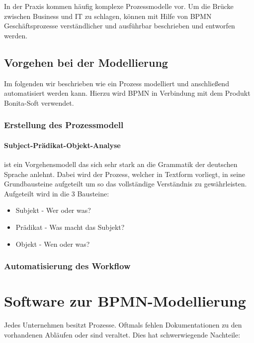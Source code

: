 In der Praxis kommen häufig komplexe Prozessmodelle vor. 
Um die Brücke zwischen Business und IT zu schlagen, 
können mit Hilfe von BPMN Geschäftsprozesse verständlicher und ausführbar 
beschrieben und entworfen werden.\\



\subsection{Vorgehen bei der Modellierung}
Im folgenden wir beschrieben wie ein Prozess modelliert und anschließend
automatisiert werden kann. Hierzu wird BPMN in Verbindung mit dem Produkt
Bonita-Soft verwendet.

\subsubsection{Erstellung des Prozessmodell}

\paragraph{Subject-Prädikat-Objekt-Analyse} ist ein Vorgehensmodell das sich
sehr stark an die Grammatik der deutschen Sprache anlehnt. Dabei wird der
Prozess, welcher in Textform vorliegt, in seine Grundbausteine aufgeteilt um so
das vollständige Verständnis zu gewährleisten. Aufgeteilt wird in die 3
Bausteine:

\begin{itemize}
\item Subjekt - Wer oder was?
\item Prädikat - Was macht das Subjekt?
\item Objekt - Wen oder was?
\end{itemize}



\subsubsection{Automatisierung des Workflow}






\clearpage
\section{Software zur BPMN-Modellierung}

Jedes Unternehmen besitzt Prozesse. Oftmals fehlen 
Dokumentationen zu den vorhandenen Abläufen oder sind veraltet. Dies hat
schwerwiegende Nachteile:

